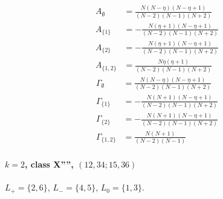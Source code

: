 \documentclass[11pt]{article}
\begin{document}
\begin{align*}
  A_{\emptyset} &= \frac{N \left(N - \eta\right) \left(N - \eta + 1\right)}{\left(N - 2\right) \left(N - 1\right) \left(N + 2\right)} \\
  A_{\{1\}} &= - \frac{N \left(\eta + 1\right) \left(N - \eta + 1\right)}{\left(N - 2\right) \left(N - 1\right) \left(N + 2\right)} \\
  A_{\{2\}} &= - \frac{N \left(\eta + 1\right) \left(N - \eta + 1\right)}{\left(N - 2\right) \left(N - 1\right) \left(N + 2\right)} \\
  A_{\{1,2\}} &= \frac{N \eta \left(\eta + 1\right)}{\left(N - 2\right) \left(N - 1\right) \left(N + 2\right)} 
\end{align*}
\begin{align*}
  \Gamma_{\emptyset} &= \frac{N \left(N - \eta\right) \left(N - \eta + 1\right)}{\left(N - 2\right) \left(N - 1\right) \left(N + 2\right)} \\
  \Gamma_{\{1\}} &= - \frac{N \left(N + 1\right) \left(N - \eta + 1\right)}{\left(N - 2\right) \left(N - 1\right) \left(N + 2\right)} \\
  \Gamma_{\{2\}} &= - \frac{N \left(N + 1\right) \left(N - \eta + 1\right)}{\left(N - 2\right) \left(N - 1\right) \left(N + 2\right)} \\
  \Gamma_{\{1,2\}} &= \frac{N \left(N + 1\right)}{\left(N - 2\right) \left(N - 1\right)} 
\end{align*}

\paragraph{$k=2$, class X'''', $(12,34;15,36)$}

$L_+=\{2,6\}$, $L_-=\{4,5\}$, $L_0=\{1,3\}$.
\end{document}
